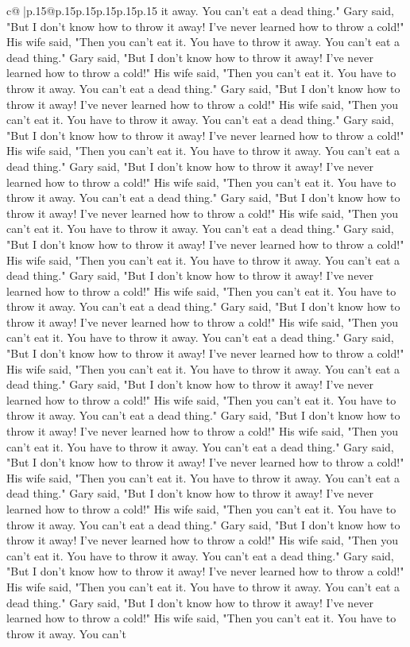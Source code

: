 \documentclass{article}
\begin{document}
{\begin{supertabular}{c@{$\;$}|p{.15\linewidth}@{}p{.15\linewidth}p{.15\linewidth}p{.15\linewidth}p{.15\linewidth}p{.15\linewidth}}
{{{it away. You can't eat a dead thing." Gary said, "But I don't know how to throw it away! I've never learned how to throw a cold!" His wife said, "Then you can't eat it. You have to throw it away. You can't eat a dead thing." Gary said, "But I don't know how to throw it away! I've never learned how to throw a cold!" His wife said, "Then you can't eat it. You have to throw it away. You can't eat a dead thing." Gary said, "But I don't know how to throw it away! I've never learned how to throw a cold!" His wife said, "Then you can't eat it. You have to throw it away. You can't eat a dead thing." Gary said, "But I don't know how to throw it away! I've never learned how to throw a cold!" His wife said, "Then you can't eat it. You have to throw it away. You can't eat a dead thing." Gary said, "But I don't know how to throw it away! I've never learned how to throw a cold!" His wife said, "Then you can't eat it. You have to throw it away. You can't eat a dead thing." Gary said, "But I don't know how to throw it away! I've never learned how to throw a cold!" His wife said, "Then you can't eat it. You have to throw it away. You can't eat a dead thing." Gary said, "But I don't know how to throw it away! I've never learned how to throw a cold!" His wife said, "Then you can't eat it. You have to throw it away. You can't eat a dead thing." Gary said, "But I don't know how to throw it away! I've never learned how to throw a cold!" His wife said, "Then you can't eat it. You have to throw it away. You can't eat a dead thing." Gary said, "But I don't know how to throw it away! I've never learned how to throw a cold!" His wife said, "Then you can't eat it. You have to throw it away. You can't eat a dead thing." Gary said, "But I don't know how to throw it away! I've never learned how to throw a cold!" His wife said, "Then you can't eat it. You have to throw it away. You can't eat a dead thing." Gary said, "But I don't know how to throw it away! I've never learned how to throw a cold!" His wife said, "Then you can't eat it. You have to throw it away. You can't eat a dead thing." Gary said, "But I don't know how to throw it away! I've never learned how to throw a cold!" His wife said, "Then you can't eat it. You have to throw it away. You can't eat a dead thing." Gary said, "But I don't know how to throw it away! I've never learned how to throw a cold!" His wife said, "Then you can't eat it. You have to throw it away. You can't eat a dead thing." Gary said, "But I don't know how to throw it away! I've never learned how to throw a cold!" His wife said, "Then you can't eat it. You have to throw it away. You can't eat a dead thing." Gary said, "But I don't know how to throw it away! I've never learned how to throw a cold!" His wife said, "Then you can't eat it. You have to throw it away. You can't eat a dead thing." Gary said, "But I don't know how to throw it away! I've never learned how to throw a cold!" His wife said, "Then you can't eat it. You have to throw it away. You can't eat a dead thing." Gary said, "But I don't know how to throw it away! I've never learned how to throw a cold!" His wife said, "Then you can't eat it. You have to throw it away. You can't }}}
\end{supertabular}}
\end{document}
